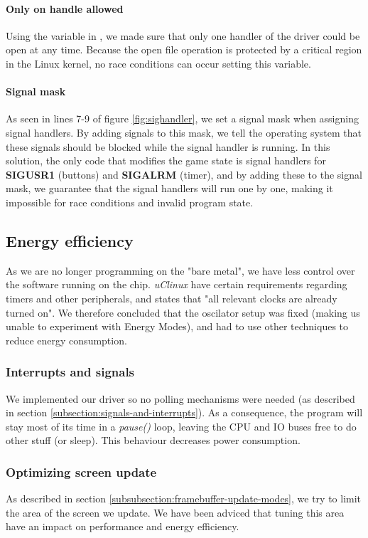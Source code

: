 \paragraph{Only on handle allowed}
Using the  variable in , we made sure that only one handler of the driver could be open at any time. Because the open file operation is protected by a critical region in the Linux kernel, no race conditions can occur setting this variable.
\paragraph{Signal mask}
As seen in lines 7-9 of figure \ref{fig:sighandler}, we set a signal mask when assigning signal handlers. By adding signals to this mask, we tell the operating system that these signals should be blocked while the signal handler is running. In this solution, the only code that modifies the game state is signal handlers for \textbf{SIGUSR1} (buttons) and \textbf{SIGALRM} (timer), and by adding these to the signal mask, we guarantee that the signal handlers will run one by one, making it impossible for race conditions and invalid program state.

\subsection{Energy efficiency}
\label{subsection:energy-efficiency}
As we are no longer programming on the "bare metal", we have less control over the software running on the chip. \emph{uClinux} have certain requirements regarding timers and other peripherals, and \cite{compendium} states that "all relevant clocks are already turned on". We therefore concluded that the oscilator setup was fixed (making us unable to experiment with Energy Modes), and had to use other techniques to reduce energy consumption.

\subsubsection{Interrupts and signals}
We implemented our driver so no polling mechanisms were needed (as described in section \ref{subsection:signals-and-interrupts}). As a consequence, the program will stay most of its time in a \emph{pause()} loop, leaving the CPU and IO buses free to do other stuff (or  sleep). This behaviour decreases power consumption.

\subsubsection{Optimizing screen update}
As described in section \ref{subsubsection:framebuffer-update-modes}, we try to limit the area of the screen we update. We have been adviced that tuning this area have an impact on performance and energy efficiency.

